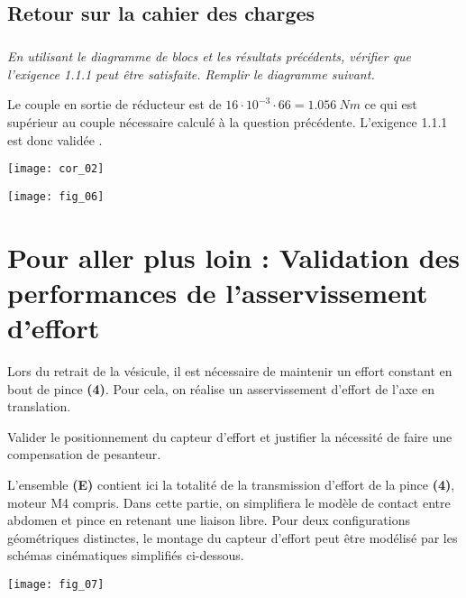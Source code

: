 \begin{multicols}{2}
\subsection*{Retour sur la cahier des charges}

\subparagraph{}
\textit{En utilisant le diagramme de blocs et les résultats précédents, vérifier que l'exigence 1.1.1 peut être satisfaite. Remplir le diagramme suivant.}

\ifprof
\begin{corrige}
Le couple en sortie de réducteur est de $16\cdot 10^{-3} \cdot 66 = \SI{1,056}{Nm}$ ce qui est supérieur au couple nécessaire calculé à la question précédente. L'exigence 1.1.1 est donc validée .
\begin{center}
\texttt{[image: cor\_02]}
\end{center}

\end{corrige}
\else
\fi

\ifprof
\else

\begin{center}
\texttt{[image: fig\_06]}
\end{center}
\fi

\vspace{1cm}

\section*{Pour aller plus loin : Validation des performances de l'asservissement d'effort}
Lors du retrait de la vésicule, il est nécessaire de maintenir un effort constant en bout de pince \textbf{(4)}. Pour cela, on réalise un asservissement d'effort de l'axe en translation. 
\begin{obj}
Valider le positionnement du capteur d'effort et justifier la nécessité de faire une compensation de pesanteur. 
\end{obj}

\ifprof
\else
L'ensemble \textbf{(E)} contient ici la totalité de la transmission d’effort de la pince \textbf{(4)}, moteur M4 compris.
Dans cette partie, on simplifiera le modèle de contact entre abdomen et pince en retenant une liaison libre.
Pour deux configurations géométriques distinctes, le montage du capteur d’effort peut être modélisé par les
schémas cinématiques simplifiés ci-dessous.

\begin{center}
\texttt{[image: fig\_07]}
\end{center}


\end{multicols}
